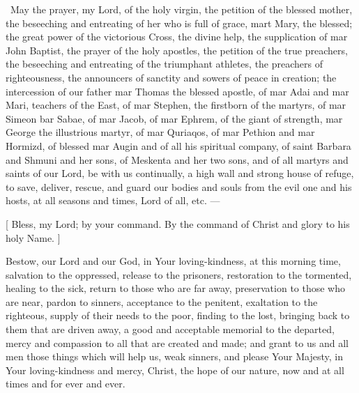 \documentclass[12pt,twoside,a5paper]{article}
\begin{document}

\cc~May the prayer, my Lord, of the holy virgin, the petition of the blessed mother, the beseeching and entreating of her who is full of grace, mart Mary, the blessed; the great power of the victorious Cross, the divine help, the supplication of mar John Baptist, the prayer of the holy apostles, the petition of the true preachers, the beseeching and entreating of the triumphant athletes, the preachers of righteousness, the announcers of sanctity and sowers of peace in creation; the intercession of our father mar Thomas the blessed apostle, of mar Adai and mar Mari, teachers of the East, of mar Stephen, the firstborn of the martyrs, of mar Simeon bar Sabae, of mar Jacob, of mar Ephrem, of the giant of strength, mar George the illustrious martyr, of mar Quriaqos, of mar Pethion and mar Hormizd, of blessed mar Augin and of all his spiritual company, of saint Barbara and Shmuni and her sons, of Meskenta and her two sons, and of all martyrs and saints of our Lord, be with us continually, a high wall and strong house of refuge, to save, deliver, rescue, and guard our bodies and souls from the evil one and his hosts, at all seasons and times, Lord of all, etc. ---

[ Bless, my Lord; by your command.  By the command of Christ and glory to his holy Name. ]



Bestow, our Lord and our God, in Your loving-kindness, at this morning time, salvation to the oppressed, release to the prisoners, restoration to the tormented, healing to the sick, return to those who are far away, preservation to those who are near, pardon to sinners, acceptance to the penitent, exaltation to the righteous, supply of their needs to the poor, finding to the lost, bringing back to them that are driven away, a good and acceptable memorial to the departed, mercy and compassion to all that are created and made; and grant to us and all men those things which will help us, weak sinners, and please Your Majesty, in Your loving-kindness and mercy, Christ, the hope of our nature, now and at all times and for ever and ever.

\end{document}

